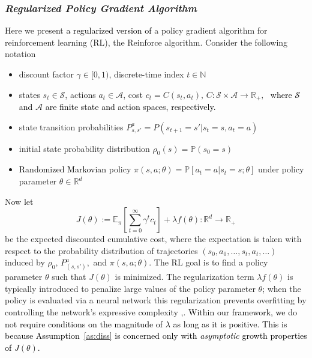 \documentclass[journal,onecolumn]{IEEEtran}
\newcommand{\rew}{J}
\newcommand{\reals}{\mathbb{R}}
\newcommand{\CE}{\mathbb{E}}
\newcommand{\PR}{\mathbb{P}}
\newcommand{\N}{\mathbb{N}}
\newcommand{\CS}{\mathcal{S}}
\newcommand{\CA}{\mathcal{A}}
\newcommand{\CR}{\mathcal{R}}
\begin{document}
\subsubsection{\textit{Regularized Policy Gradient Algorithm}}
Here we present \textcolor{black}{a regularized version of} a policy gradient algorithm for reinforcement learning (RL), the Reinforce algorithm. Consider the following notation
\begin{itemize}
    \item[-] discount factor $\gamma \in [0,1)$, discrete-time index $t\in\N$
    \item[-] states $s_t \in \CS$, actions $a_t \in \CA$, cost $c_t = C(s_t,a_t),\, C:\CS \times \CA \to \reals_+, \, \,$ \textcolor{black}{where $\CS$ and $\CA$ are finite state and action spaces, respectively.}
    \item[-] state transition probabilities $P_{s,s'}^a = P(s_{t+1} = s' | s_t = s,a_t = a)$
    \item[-] initial state probability distribution $\rho_0(s) = \PR(s_0 = s)$
    \item[-] \textcolor{black}{Randomized Markovian} policy $\pi(s,a;\theta) = \PR[a_t=a | s_t=s; \theta]$ under policy parameter $\theta \in \reals^d$
\end{itemize}
Now let 
\begin{equation}
\label{eq:mdpJ}
J(\theta) := \CE_{\pi}\left[\sum_{t=0}^{\infty}\gamma^t c_t \right] + \lambda f(\theta) : \reals^d \to \reals_+
\end{equation}
be the expected discounted cumulative cost, where the expectation is taken with respect to the probability distribution of trajectories $(s_0,a_0,\dots,s_t,a_t,\dots)$ induced by $\rho_0, \, P_{(s,s')}^a,$ and $\pi(s,a;\theta)$. The RL goal is to find a policy parameter $\theta$ such that $J(\theta)$ is minimized. The regularization term $\lambda f(\theta)$ is typically introduced to penalize large values of the policy parameter $\theta$; when the policy is evaluated via a neural network this regularization prevents overfitting by controlling the network's expressive complexity \cite{cheng2019control},\cite{kumar2021dr3}. \textcolor{black}{Within our framework, we do not require conditions on the magnitude of $\lambda$ as long as it is positive. This is because Assumption~\ref{as:diss} is concerned only with \textit{asymptotic} growth properties of $\rew(\theta)$.}
\end{document}
